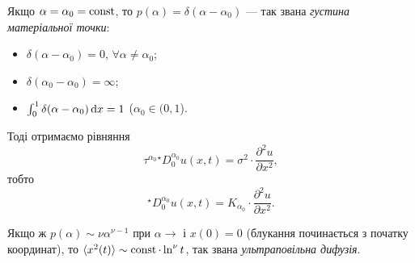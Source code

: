 \begin{example}
    Якщо $\alpha = \alpha_0 = \operatorname{const}$, то $p(\alpha) = \delta(\alpha - \alpha_0)$ --- так звана \textit{густина матеріальної точки}:
    \begin{itemize}
        \item $\delta (\alpha - \alpha_0) = 0$, $\forall \alpha \ne \alpha_0$;
        \item $\delta (\alpha_0 - \alpha_0) = \infty$;
        \item $\int_0^1 \delta(\alpha - \alpha_0) \mathop{}\!\mathrm{d} x = 1$ ($\alpha_0 \in (0, 1$).
    \end{itemize}    
    
    Тоді отримаємо рівняння
    \begin{equation}
        \tau^{\alpha_0} {}^\star D_0^{\alpha_0} u(x, t) = \sigma^2 \cdot \frac{\partial^2 u}{\partial x^2},
    \end{equation}
    тобто
    \begin{equation}
        {}^\star D_0^{\alpha_0} u(x, t) = K_{\alpha_0} \cdot \frac{\partial^2 u}{\partial x^2}.
    \end{equation}
\end{example}

\begin{example}
    Якщо ж $p(\alpha) \sim \nu \alpha^{\nu - 1}$ при $\alpha \to $ і $x(0) = 0$ (блукання починається з початку координат), то $\langle x^2(t) \rangle \sim \operatorname{const} \cdot \ln^\nu t$, так звана \textit{ультраповільна дифузія}.
\end{example}
